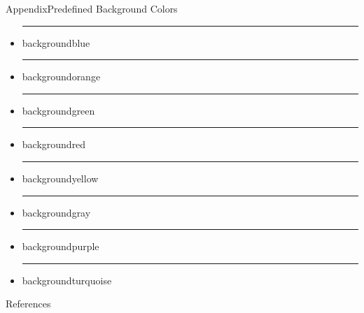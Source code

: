 \documentclass{beamer}
\begin{document}
\begin{frame}{Appendix}{Predefined Background Colors}
	\begin{itemize}
		\item {\color{backgroundblue}\rule{.7cm}{.4cm}} backgroundblue
		\item {\color{backgroundorange}\rule{.7cm}{.4cm}} backgroundorange
		\item {\color{backgroundgreen}\rule{.7cm}{.4cm}} backgroundgreen
		\item {\color{backgroundred}\rule{.7cm}{.4cm}} backgroundred
		\item {\color{backgroundyellow}\rule{.7cm}{.4cm}} backgroundyellow
		\item {\color{backgroundgray}\rule{.7cm}{.4cm}} backgroundgray
		\item {\color{backgroundpurple}\rule{.7cm}{.4cm}} backgroundpurple
		\item {\color{backgroundturquoise}\rule{.7cm}{.4cm}} backgroundturquoise
	\end{itemize}
\end{frame}

\begin{frame}[t,allowframebreaks]{References}
	\scriptsize
	\nocite{*}
	
	
\end{frame}
\end{document}
